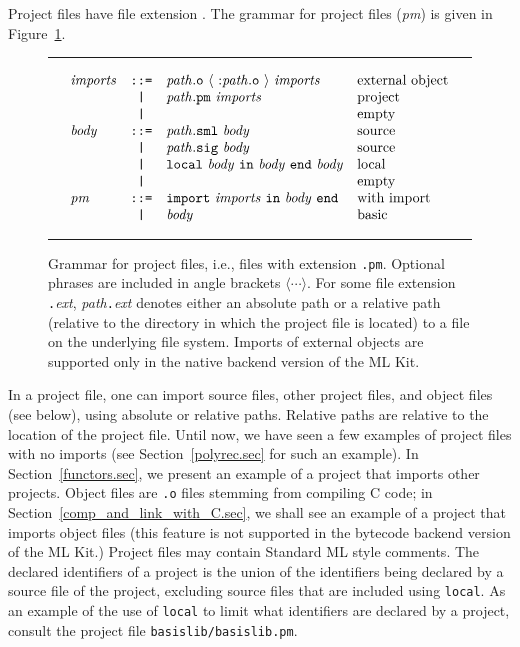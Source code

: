 \documentclass[12pt]{book}
\begin{document}
Project files have file extension . The 
%
grammar for project files ({\it pm}) is given in Figure~\ref{pm_grammar.fig}.
\begin{figure}
\hrule\medskip
$$\begin{array}{lcll}
  {\it imports} & \verb+::=+ & {\it path}{\tt .o} ~\langle~{\tt :} {\it path}{\tt .o}~\rangle ~ 
                                  {\it imports} & \mbox{external object} \\
                & \verb+|+   & {\it path}{\tt .pm} ~ {\it imports} & \mbox{project} \\
                & \verb+|+   & & \mbox{empty} \\
  {\it body}  & \verb+::=+ & {\it path}{\tt .sml} ~{\it body} & \mbox{source} \\
                & \verb+|+   & {\it path}{\tt .sig} ~{\it body} & \mbox{source} \\
                & \verb+|+   & {\tt local}~{\it body}~{\tt in}~{\it body}~{\tt end}~{\it body} & \mbox{local} \\
                & \verb+|+   & & \mbox{empty} \\
  {\it pm}      & \verb+::=+ & {\tt import} ~{\it imports}~ {\tt in} ~ {\it body}~ {\tt end} & \mbox{with import} \\
                & \verb+|+   & {\it body} & \mbox{basic} 
  \end{array}$$
\caption{Grammar for project files, i.e., files with extension {\tt .pm}. 
  Optional phrases are included in angle brackets
  $\langle\cdots\rangle$. For some file extension {\tt .}{\it ext},
  {\it path}{\tt .}{\it ext\/} denotes either an absolute path or a
  relative path (relative to the directory in which the project file
  is located) to a file on the underlying file system. Imports of
  external objects are supported only in the native backend version of
  the ML Kit.}
\label{pm_grammar.fig}
\medskip \hrule
\end{figure}
In a project file, one can import source files, other project files,
and object files (see below), using absolute or relative
%
%
paths.  Relative paths are relative to the location of the project
file.  Until now, we have seen a few examples of project files with no
imports (see Section~\ref{polyrec.sec} for such an example). In
Section~\ref{functors.sec}, we present an example of a project that
imports other projects. Object files are {\tt .o} files stemming from
compiling C code; in Section~\ref{comp_and_link_with_C.sec}, we shall
see an example of a project that imports object files (this feature is
not supported in the bytecode backend version of the ML Kit.) Project
files may contain Standard ML style
%
%
comments. The declared identifiers of a project is the union of the
identifiers being declared by a source file of the project, excluding
source files that are included using {\tt local}. As an example of
the use of {\tt local} to limit what identifiers are declared by a
project, consult the project file {\tt basislib/basislib.pm}.
\end{document}
